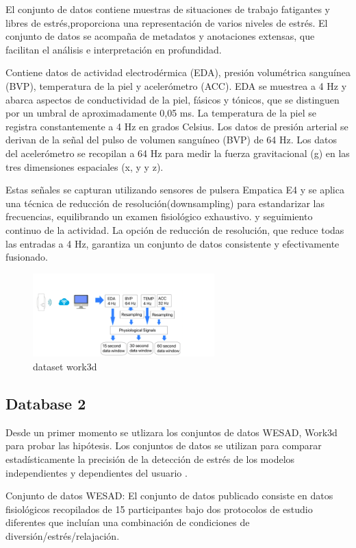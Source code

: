 El conjunto de datos contiene muestras de situaciones de trabajo fatigantes y libres de estrés,proporciona una representación  de varios niveles de estrés. El conjunto de datos se acompaña de metadatos y anotaciones extensas, que facilitan el análisis e interpretación en profundidad. 

Contiene  datos de actividad electrodérmica (EDA), presión volumétrica sanguínea (BVP), temperatura de la piel y acelerómetro (ACC). EDA se muestrea a 4 Hz y abarca aspectos de conductividad de la piel, fásicos y tónicos, que se distinguen por un umbral de aproximadamente 0,05 ms. La temperatura de la piel se registra constantemente a 4 Hz en grados Celsius. 
Los datos de presión arterial se derivan de la señal del pulso de volumen sanguíneo (BVP) de 64 Hz. Los datos del acelerómetro se recopilan a 64 Hz para medir la fuerza gravitacional (g) en las tres dimensiones espaciales (x, y y z). 

Estas señales se capturan utilizando sensores de pulsera Empatica E4 y se aplica una técnica de reducción de resolución(downsampling) para estandarizar las frecuencias, equilibrando un examen fisiológico exhaustivo. 
y seguimiento continuo de la actividad. La opción de reducción de resolución, que reduce todas las entradas a 4 Hz, garantiza un conjunto de datos consistente y efectivamente fusionado.


\begin{figure}[h]
    \centering
    \includegraphics[width=7cm]{Graficos/captura3.png}
    \caption{dataset work3d}
    \label{fig:enter-label}
\end{figure}


\subsection*{Database 2}
Desde un primer momento se utlizara  los conjuntos de datos WESAD, Work3d para probar las hipótesis. Los  conjuntos de datos se utilizan para comparar estadísticamente la precisión de la detección de estrés de los modelos independientes y dependientes del usuario .

Conjunto de datos WESAD: El conjunto de datos publicado consiste en datos fisiológicos recopilados de 15 participantes bajo dos protocolos de estudio diferentes que incluían una combinación de condiciones de diversión/estrés/relajación.




